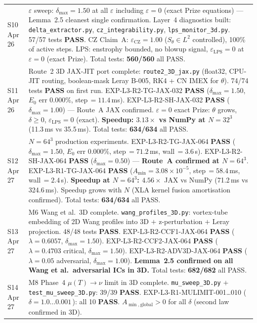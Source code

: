 \documentclass[11pt, a4paper]{article}
\theoremstyle{definition}
\theoremstyle{remark}
\newcommand{\eps}{\varepsilon}
\newcommand{\lam}{\lambda}
\newcommand{\PASS}{\textcolor{passgreen}{\textbf{PASS}}}
\newcommand{\thet}{\theta}
\newcommand{\delt}{\delta}
\begin{document}
\begin{center}
\begin{tabular}{lp{9cm}}
S10 Apr 26 &
  $\eps$ sweep: $\delt_{\max}=1.50$ at all $\eps$ including $\eps=0$ (exact Prize equations) ---
  Lemma~2.5 cleanest single confirmation.
  Layer~4 diagnostics built:
  \texttt{delta\_extractor.py}, \texttt{cz\_integrability.py}, \texttt{lps\_monitor\_3d.py}.
  57/57 tests \PASS{}.
  CZ Claim~A: $\eps_{\mathrm{CZ}}=1.00$ ($S_\thet \in L^2$ controlled), 100\% of active steps.
  LPS: enstrophy bounded, no blowup signal, $\eps_{\mathrm{LPS}}=0$ at $\eps=0$ (exact Prize).
  Total tests: \textbf{560/560} all PASS. \\
S11 Apr 26 &
  Route~2 3D JAX-JIT port complete: \texttt{route2\_3D\_jax.py}
  (float32, CPU-JIT routing, boolean-mask Leray B-005, RK4 + CN IMEX for $\thet$).
  74/74 tests \PASS{} on first run.
  EXP-L3-R2-TG-JAX-032 \PASS{} ($\delt_{\max}=1.50$, $E_0$ err 0.000\%, step\,$=11.4$\,ms).
  EXP-L3-R2-SH-JAX-032 \PASS{} ($\delt_{\max}=1.00$) --- Route~A JAX confirmed.
  $\eps=0$ exact Prize: $\thet$ grows, $\delt \geq 0$, $\eps_{\mathrm{LPS}}=0$ (exact).
  \textbf{Speedup: $3.13\times$ vs NumPy at $N=32^3$} (11.3\,ms vs 35.5\,ms).
  Total tests: \textbf{634/634} all PASS. \\
S12 Apr 27 &
  $N=64^3$ production experiments.
  EXP-L3-R2-TG-JAX-064 \PASS{} ($\delt_{\max}=1.50$, $E_0$ err 0.000\%, step\,$=71.2$\,ms, wall\,$=3.6$\,s).
  EXP-L3-R2-SH-JAX-064 \PASS{} ($\delt_{\max}=0.50$) --- \textbf{Route~A confirmed at $N=64^3$}.
  EXP-L3-R1-TG-JAX-064 \PASS{} ($A_{\min}=3.08\times10^{-5}$, step\,$=58.4$\,ms, wall\,$=2.4$\,s).
  \textbf{Speedup at $N=64^3$: $4.56\times$} JAX vs NumPy (71.2\,ms vs 324.6\,ms).
  Speedup grows with $N$ (XLA kernel fusion amortisation confirmed).
  Total tests: \textbf{634/634} all PASS. \\
S13 Apr 27 &
  M6 Wang et al.\ 3D complete. \texttt{wang\_profiles\_3D.py}: vortex-tube
  embedding of 2D Wang profiles into 3D $+$ z-perturbation $+$ Leray projection.
  48/48 tests \PASS{}.
  EXP-L3-R2-CCF1-JAX-064 \PASS{} ($\lam=0.6057$, $\delt_{\max}=1.50$).
  EXP-L3-R2-CCF2-JAX-064 \PASS{} ($\lam=0.4703$ critical, $\delt_{\max}=1.50$).
  EXP-L3-R2-ADV3D-JAX-064 \PASS{} ($\lam=0.05$ adversarial, $\delt_{\max}=1.00$).
  \textbf{Lemma~2.5 confirmed on all Wang et al.\ adversarial ICs in 3D.}
  Total tests: \textbf{682/682} all PASS. \\
S14 Apr 27 &
  M8 Phase~4 $\mu(T)\to\nu$ limit in 3D complete.
  \texttt{mu\_sweep\_3D.py} $+$ \texttt{test\_mu\_sweep\_3D.py}: 39/39 \PASS{}.
  EXP-L3-R1-MULIMIT-001\ldots010 (\,$\delta=1.0\ldots0.001$\,): all 10 \PASS{}.
  $A_{\min,\text{global}} > 0$ for all $\delta$ (second law confirmed in 3D).

\end{tabular}
\end{center}
\end{document}
